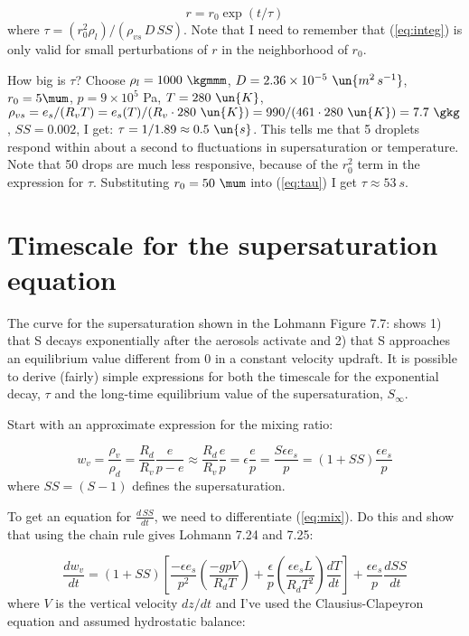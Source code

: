 \documentclass[12pt]{article}
\begin{document}
\begin{equation}
  \label{eq:integ}
  r = r_0 \exp(t/\tau)
\end{equation}
where $\tau=(r_0^2 \rho_l)/(\rho_{vs}\, D\,SS)$. Note that I need to
remember that (\ref{eq:integ}) is only valid for small perturbations
of $r$ in the neighborhood of $r_0$.

How big is $\tau$?  Choose $\rho_l=1000\ \kgmmm$, $D=2.36 \times 10^{-5}\ \un{m^2\,s^{-1}}$,
$r_0=5 \mum$, $p=9 \times 10^5$ Pa, $T=280\ \un{K}$,
$\rho_{vs}=e_s/(R_v T) = e_s(T)/(R_v \cdot 280\ \un{K}) = 990/(461 \cdot 280\ \un{K})%
=7.7\ \gkg$,  $SS=0.002$, I get: $\tau = 1/1.89 \approx 0.5\ \un{s}$.  This tells
me that 5 \mum droplets respond within about a second to fluctuations in supersaturation or
temperature.  Note that 50 \mum drops are much less responsive, because of the $r_0^2$ term
in the expression for $\tau$.  Substituting $r_0=50\ \mum$ into (\ref{eq:tau}) I get
$\tau \approx 53\ s$.


\section{Timescale for the supersaturation equation}
\label{sec:supersat}

The curve for the supersaturation shown in the Lohmann Figure 7.7:
shows 1) that S decays exponentially after the aerosols activate and 2) that S
approaches an equilibrium value different from 0 in a constant velocity updraft.
It is possible to derive (fairly) simple expressions for both the timescale for
the exponential decay, $\tau$ and the long-time equilibrium value of the supersaturation,
$S_\infty$.

Start with an approximate expression for the mixing ratio:

\begin{equation}
  \label{eq:mix}
  w_v = \frac{\rho_v}{\rho_d} = \frac{R_d}{R_v} \frac{e}{p - e} \approx \frac{R_d}{R_v} \frac{e}{p}=
\epsilon \frac{e}{p} = \frac{S \epsilon e_s}{p} = (1 + SS) \frac{\epsilon e_s}{p}
\end{equation}
where $SS=(S-1)$ defines the supersaturation.

To get an equation for $\frac{d\,SS}{dt}$, we need to differentiate (\ref{eq:mix}).  Do this
and show that using the chain rule gives Lohmann 7.24 and 7.25:

\begin{equation}
  \label{eq:chain}
  \frac{d w_v}{dt} = \left (1 + SS \right )  \left [ \frac{-\epsilon e_s}{p^2} 
\left ( \frac{-g p V}{R_d T} \right ) + \frac{\epsilon}{p} \left ( 
\frac{\epsilon e_s L}{R_d T^2} \right ) \frac{dT}{dt} \right ]
+ \frac{\epsilon e_s}{p} \frac{dSS}{dt}
\end{equation}
where $V$ is the vertical velocity $dz/dt$ and I've used the Clausius-Clapeyron equation and
assumed hydrostatic balance:
\end{document}

